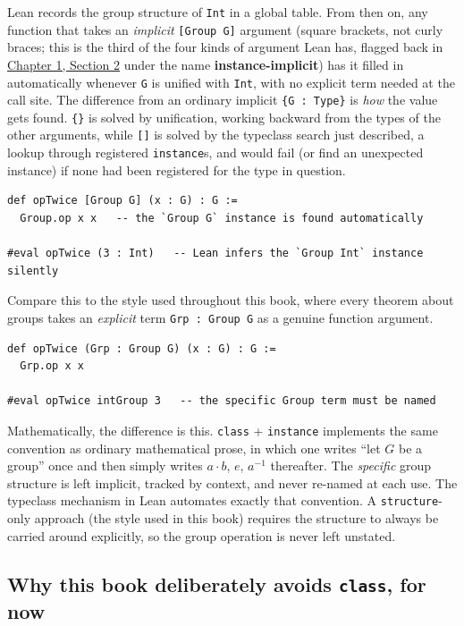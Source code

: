 Lean records the group structure of \texttt{Int} in a global table. From then on, any function that takes an \emph{implicit} \texttt{[Group G]} argument (square brackets, not curly braces; this is the third of the four kinds of argument Lean has, flagged back in \hyperref[sec:01-basics:02-def-let-implicit:1]{Chapter 1, Section 2} under the name \textbf{instance-implicit}) has it filled in automatically whenever \texttt{G} is unified with \texttt{Int}, with no explicit term needed at the call site. The difference from an ordinary implicit \texttt{\{G : Type\}} is \emph{how} the value gets found. \texttt{\{\}} is solved by unification, working backward from the types of the other arguments, while \texttt{[]} is solved by the typeclass search just described, a lookup through registered \texttt{instance}s, and would fail (or find an unexpected instance) if none had been registered for the type in question.

\begin{lstlisting}
def opTwice [Group G] (x : G) : G :=
  Group.op x x   -- the `Group G` instance is found automatically

#eval opTwice (3 : Int)   -- Lean infers the `Group Int` instance silently
\end{lstlisting}

Compare this to the style used throughout this book, where every theorem about groups takes an \emph{explicit} term \texttt{Grp : Group G} as a genuine function argument.

\begin{lstlisting}
def opTwice (Grp : Group G) (x : G) : G :=
  Grp.op x x

#eval opTwice intGroup 3   -- the specific Group term must be named
\end{lstlisting}

Mathematically, the difference is this. \texttt{class} + \texttt{instance} implements the same convention as ordinary mathematical prose, in which one writes ``let \(G\) be a group'' once and then simply writes \(a \cdot b\), \(e\), \(a^{-1}\) thereafter. The \emph{specific} group structure is left implicit, tracked by context, and never re-named at each use. The typeclass mechanism in Lean automates exactly that convention. A \texttt{structure}-only approach (the style used in this book) requires the structure to always be carried around explicitly, so the group operation is never left unstated.

\subsection{\texorpdfstring{Why this book deliberately avoids \texttt{class}, for now}{Why this book deliberately avoids class, for now}}\label{sec:05-rigor-check:01-structure-vs-class:3}

